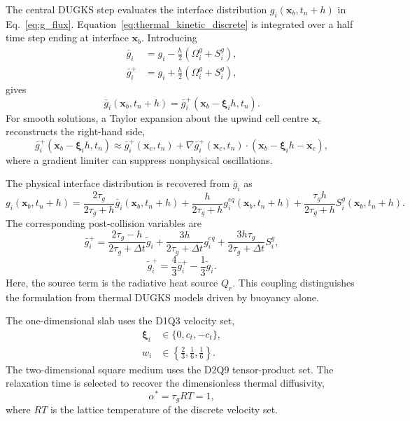 \documentclass[a4paper,12pt]{ctexart}
\numberwithin{equation}{section}
\newcommand{\vb}[1]{\bm{#1}}
\newcommand{\vx}{\vb{x}}
\newcommand{\vxi}{\bm{\xi}}
\begin{document}
The central DUGKS step evaluates the interface distribution $g_i(\vx_b,t_n+h)$ in Eq.~\eqref{eq:g_flux}. Equation~\eqref{eq:thermal_kinetic_discrete} is integrated over a half time step ending at interface $\vx_b$. Introducing
\begin{equation*}
\begin{aligned}
\bar g_i&=g_i-\frac{h}{2}\left(\Omega_i^g+S_i^g\right),
\\
\bar g_i^+&=g_i+\frac{h}{2}\left(\Omega_i^g+S_i^g\right),
\end{aligned}
\end{equation*}
gives
\begin{equation*}
\bar g_i(\vx_b,t_n+h)=\bar g_i^+(\vx_b-\vxi_i h,t_n).
\end{equation*}
For smooth solutions, a Taylor expansion about the upwind cell centre $\vx_c$ reconstructs the right-hand side,
\begin{equation}
\bar g_i^+(\vx_b-\vxi_i h,t_n)
\approx \bar g_i^+(\vx_c,t_n)+\nabla\bar g_i^+(\vx_c,t_n)\cdot(\vx_b-\vxi_i h-\vx_c),
\label{eq:g_reconstruction}
\end{equation}
where a gradient limiter can suppress nonphysical oscillations.

The physical interface distribution is recovered from $\bar g_i$ as
\begin{equation*}
g_i(\vx_b,t_n+h)=\frac{2\tau_g}{2\tau_g+h}\bar g_i(\vx_b,t_n+h)
+\frac{h}{2\tau_g+h}g_i^{eq}(\vx_b,t_n+h)
+\frac{\tau_g h}{2\tau_g+h}S_i^g(\vx_b,t_n+h).
\end{equation*}
The corresponding post-collision variables are
\begin{equation}
\bar g_i^+=\frac{2\tau_g-h}{2\tau_g+\Delta t}\tilde g_i
+\frac{3h}{2\tau_g+\Delta t}g_i^{eq}
+\frac{3h\tau_g}{2\tau_g+\Delta t}S_i^g,
\label{eq:g_bar_plus}
\end{equation}
\begin{equation}
\tilde g_i^+=\frac{4}{3}\bar g_i^+-\frac{1}{3}\tilde g_i.
\label{eq:g_tilde_plus}
\end{equation}
Here, the source term is the radiative heat source $Q_r$. This coupling distinguishes the formulation from thermal DUGKS models driven by buoyancy alone.

The one-dimensional slab uses the D1Q3 velocity set,
\begin{equation*}
\begin{aligned}
\vxi_i&\in \{0, c_t, -c_t\},
\\
w_i&\in \left\{ \frac{2}{3}, \frac{1}{6}, \frac{1}{6} \right\}.
\end{aligned}
\end{equation*}
The two-dimensional square medium uses the D2Q9 tensor-product set. The relaxation time is selected to recover the dimensionless thermal diffusivity,
\begin{equation*}
\alpha^*=\tau_g RT=1,
\end{equation*}
where $RT$ is the lattice temperature of the discrete velocity set.
\end{document}
